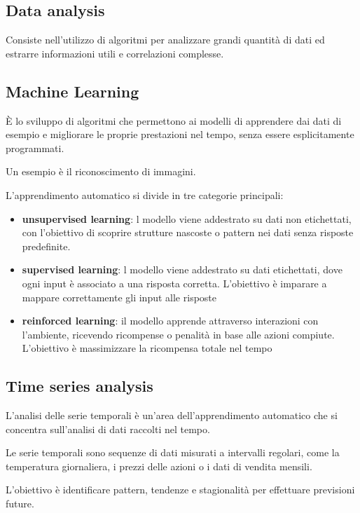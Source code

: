 \documentclass[12pt, a4paper, oneside]{book}
\begin{document}
    \subsection{Data analysis}
    Consiste nell'utilizzo di algoritmi per analizzare grandi quantità di dati ed estrarre informazioni utili e correlazioni complesse.

    \subsection{Machine Learning}
    È lo sviluppo di algoritmi che permettono ai modelli di apprendere dai dati di esempio e migliorare le proprie prestazioni nel tempo, senza essere esplicitamente programmati.
    
    Un esempio è il riconoscimento di immagini.

    L’apprendimento automatico si divide in tre categorie principali:
    \begin{itemize}
      \item \textbf{unsupervised learning}: l modello viene addestrato su dati non etichettati, con l’obiettivo di scoprire strutture nascoste o pattern nei dati senza risposte predefinite.
    \item \textbf{supervised learning}: l modello viene addestrato su dati etichettati, dove ogni input è associato a una risposta corretta. L’obiettivo è imparare a mappare correttamente gli input alle risposte
      \item \textbf{reinforced learning}: il modello apprende attraverso interazioni con l’ambiente, ricevendo ricompense o penalità in base alle azioni compiute. L’obiettivo è massimizzare la ricompensa totale nel tempo
    \end{itemize}

    \subsection{Time series analysis}
    L’analisi delle serie temporali è un’area dell’apprendimento automatico che si concentra sull’analisi di dati raccolti nel tempo.

    Le serie temporali sono sequenze di dati misurati a intervalli regolari, come la temperatura giornaliera, i prezzi delle azioni o i dati di vendita mensili.

    L’obiettivo è identificare pattern, tendenze e stagionalità per effettuare previsioni future.

    \vspace{1em}
\end{document}
